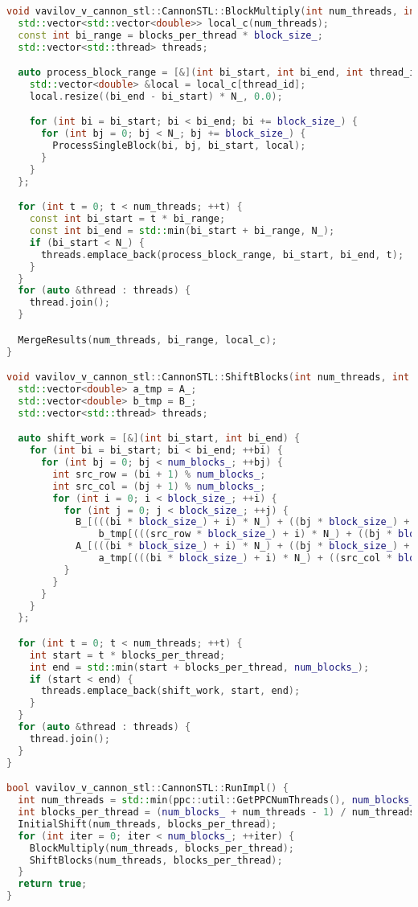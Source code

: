 \documentclass[a4paper,12pt]{article}
\begin{document}
\begin{lstlisting}[language=C++]
void vavilov_v_cannon_stl::CannonSTL::BlockMultiply(int num_threads, int blocks_per_thread) {
  std::vector<std::vector<double>> local_c(num_threads);
  const int bi_range = blocks_per_thread * block_size_;
  std::vector<std::thread> threads;

  auto process_block_range = [&](int bi_start, int bi_end, int thread_id) {
    std::vector<double> &local = local_c[thread_id];
    local.resize((bi_end - bi_start) * N_, 0.0);

    for (int bi = bi_start; bi < bi_end; bi += block_size_) {
      for (int bj = 0; bj < N_; bj += block_size_) {
        ProcessSingleBlock(bi, bj, bi_start, local);
      }
    }
  };

  for (int t = 0; t < num_threads; ++t) {
    const int bi_start = t * bi_range;
    const int bi_end = std::min(bi_start + bi_range, N_);
    if (bi_start < N_) {
      threads.emplace_back(process_block_range, bi_start, bi_end, t);
    }
  }
  for (auto &thread : threads) {
    thread.join();
  }

  MergeResults(num_threads, bi_range, local_c);
}

void vavilov_v_cannon_stl::CannonSTL::ShiftBlocks(int num_threads, int blocks_per_thread) {
  std::vector<double> a_tmp = A_;
  std::vector<double> b_tmp = B_;
  std::vector<std::thread> threads;

  auto shift_work = [&](int bi_start, int bi_end) {
    for (int bi = bi_start; bi < bi_end; ++bi) {
      for (int bj = 0; bj < num_blocks_; ++bj) {
        int src_row = (bi + 1) % num_blocks_;
        int src_col = (bj + 1) % num_blocks_;
        for (int i = 0; i < block_size_; ++i) {
          for (int j = 0; j < block_size_; ++j) {
            B_[(((bi * block_size_) + i) * N_) + ((bj * block_size_) + j)] =
                b_tmp[(((src_row * block_size_) + i) * N_) + ((bj * block_size_) + j)];
            A_[(((bi * block_size_) + i) * N_) + ((bj * block_size_) + j)] =
                a_tmp[(((bi * block_size_) + i) * N_) + ((src_col * block_size_) + j)];
          }
        }
      }
    }
  };

  for (int t = 0; t < num_threads; ++t) {
    int start = t * blocks_per_thread;
    int end = std::min(start + blocks_per_thread, num_blocks_);
    if (start < end) {
      threads.emplace_back(shift_work, start, end);
    }
  }
  for (auto &thread : threads) {
    thread.join();
  }
}

bool vavilov_v_cannon_stl::CannonSTL::RunImpl() {
  int num_threads = std::min(ppc::util::GetPPCNumThreads(), num_blocks_);
  int blocks_per_thread = (num_blocks_ + num_threads - 1) / num_threads;
  InitialShift(num_threads, blocks_per_thread);
  for (int iter = 0; iter < num_blocks_; ++iter) {
    BlockMultiply(num_threads, blocks_per_thread);
    ShiftBlocks(num_threads, blocks_per_thread);
  }
  return true;
}

\end{lstlisting}
\end{document}
